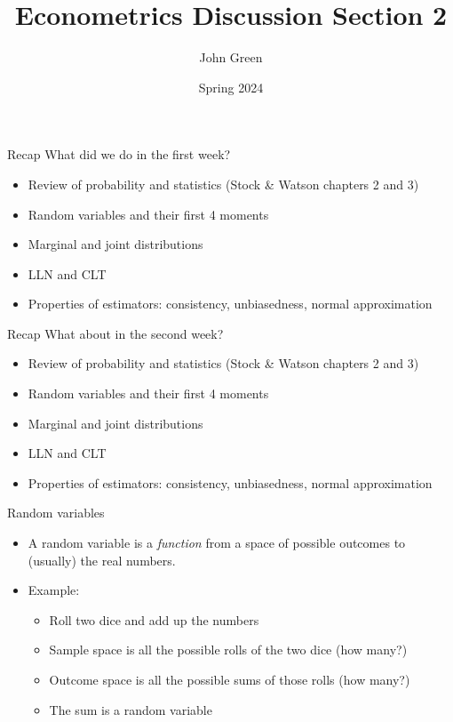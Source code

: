 \documentclass[aspectratio=169]{beamer}
\title{Econometrics Discussion Section 2}
\author{John Green}
\date{Spring 2024}
\begin{document}
\begin{frame}
    \titlepage 
\end{frame}

\begin{frame}{Recap}
    What did we do in the first week?
    \begin{itemize}
        \item Review of probability and statistics (Stock \& Watson chapters 2 and 3)
        \item Random variables and their first 4 moments
        \item Marginal and joint distributions
        \item LLN and CLT
        \item Properties of estimators: consistency, unbiasedness, normal approximation
    \end{itemize}
\end{frame}

\begin{frame}{Recap}
    What about in the second week?
    \begin{itemize}
        \item Review of probability and statistics (Stock \& Watson chapters 2 and 3)
        \item Random variables and their first 4 moments
        \item Marginal and joint distributions
        \item LLN and CLT
        \item Properties of estimators: consistency, unbiasedness, normal approximation
    \end{itemize}
\end{frame}

\begin{frame}{Random variables}
    \begin{itemize}
        \item A random variable is a \textit{function} from a space of possible outcomes to (usually) the real numbers.
        \item Example: 
        \begin{itemize}
            \item Roll two dice and add up the numbers
            \item Sample space is all the possible rolls of the two dice (how many?)
            \item Outcome space is all the possible sums of those rolls (how many?)
            \item The sum is a random variable
        \end{itemize} 
    \end{itemize}
\end{frame}
\end{document}
